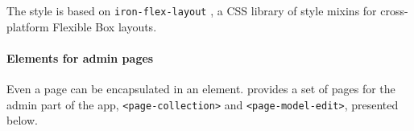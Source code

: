 The style is based on \texttt{iron-flex-layout} \cite{iron-elements}, a CSS library of style mixins for cross-platform Flexible Box \cite{css-flexbox} layouts.

\paragraph{Elements for admin pages}

Even a page can be encapsulated in an element.  provides a set of pages for the admin part of the app, \texttt{<page-collection>} and \texttt{<page-model-edit>}, presented below.


